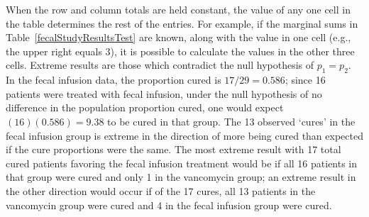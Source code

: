 When the row and column totals are held constant, the value of any one cell in the table determines the rest of the entries.  For example, if the marginal sums in Table~\ref{fecalStudyResultsTest} are known, along with the value in one cell (e.g., the upper right equals 3), it is possible to calculate the values in the other three cells. Extreme results are those which contradict the null hypothesis of $p_1 = p_2$. In the fecal infusion data, the proportion cured is $17/29 = 0.586$; since 16 patients were treated with fecal infusion, under the null hypothesis of no difference in the population proportion cured, one would expect $(16)(0.586) = 9.38$ to be cured in that group.  The 13 observed `cures' in the fecal infusion group is extreme in the direction of more being cured than expected if the cure proportions were the same. The most extreme result with 17 total cured patients favoring the fecal infusion treatment would be if all 16 patients in that group were cured and only 1 in the vancomycin group; an extreme result in the other direction would occur if of the 17 cures, all 13 patients in the vancomycin group were cured and 4 in the fecal infusion group were cured. 

\newpage

